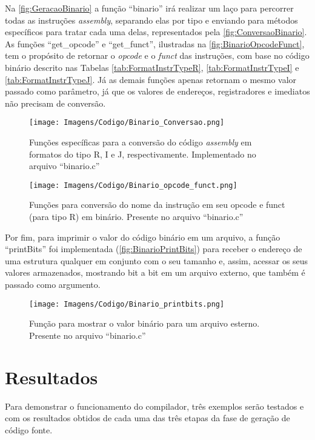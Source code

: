 \documentclass[
	12pt,				%
	oneside,
	a4paper,			%
	english,			%
	french,				%
	spanish,			%
	brazil,				%
	]{abntex2}
\begin{document}
Na \autoref{fig:GeracaoBinario} a função ``binario'' irá realizar um laço para percorrer todas as instruções \emph{assembly}, separando elas por tipo e enviando para métodos específicos para tratar cada uma delas, representados pela \autoref{fig:ConversaoBinario}. As funções ``get\_opcode'' e ``get\_funct'', ilustradas na \autoref{fig:BinarioOpcodeFunct}, tem o propósito de retornar o \emph{opcode} e o \emph{funct} das instruções, com base no código binário descrito nas Tabelas \ref{tab:FormatInstrTypeR}, \ref{tab:FormatInstrTypeI} e \ref{tab:FormatInstrTypeJ}. Já as demais funções apenas retornam o mesmo valor passado como parâmetro, já que os valores de endereços, registradores e imediatos não precisam de conversão.

\begin{figure}[htbp]
\centering 
\caption{Funções específicas para a conversão do código \emph{assembly} em formatos do tipo R, I e J, respectivamente. Implementado no arquivo \nohyphens{``binario.c''}} 
\label{fig:ConversaoBinario}
\graphicspath{ {./Imagens/} } 
\texttt{[image: Imagens/Codigo/Binario\_Conversao.png]}
\end{figure}

\begin{figure}[htbp]
\centering 
\caption{Funções para conversão do nome da instrução em seu opcode e funct (para tipo R) em binário. Presente no arquivo \nohyphens{``binario.c''}} 
\label{fig:BinarioOpcodeFunct}
\graphicspath{ {./Imagens/} } 
\texttt{[image: Imagens/Codigo/Binario\_opcode\_funct.png]}
\end{figure}


Por fim, para imprimir o valor do código binário em um arquivo, a função ``printBits'' foi implementada (\autoref{fig:BinarioPrintBits}) para receber o endereço de uma estrutura qualquer em conjunto com o seu tamanho e, assim, acessar os seus valores armazenados, mostrando bit a bit em um arquivo externo, que também é passado como argumento. 

\begin{figure}[htbp]
\centering 
\caption{Função para mostrar o valor binário para um arquivo esterno. Presente no arquivo \nohyphens{``binario.c''}} 
\label{fig:BinarioPrintBits}
\graphicspath{ {./Imagens/} } 
\texttt{[image: Imagens/Codigo/Binario\_printbits.png]}
\end{figure}

\chapter{Resultados}
Para demonstrar o funcionamento do compilador, três exemplos serão testados e com os resultados obtidos de cada uma das três etapas da fase de geração de código fonte.
\end{document}
